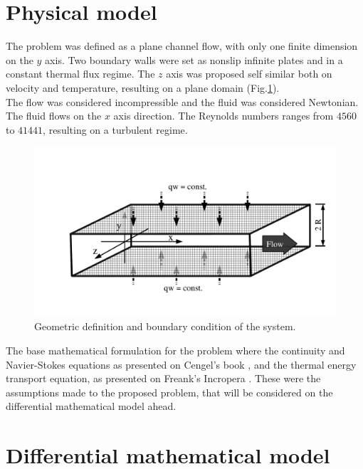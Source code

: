 \documentclass[10pt]{article} %
\begin{document}
\section{Physical model}

The problem was defined as a plane channel flow, with only one finite dimension on the $y$ axis. Two boundary walls were set as nonslip infinite plates and in a constant thermal flux regime. The $z$ axis was proposed self similar both on velocity and temperature, resulting on a plane domain (Fig.\ref{figure.1}). \\
The flow was considered incompressible and the fluid was considered Newtonian. The fluid flows on the $x$ axis direction. The Reynolds numbers ranges from $4560$ to $41441$, resulting on a turbulent regime. 

\begin{figure}[h!]
	\centering
	\includegraphics[angle=0, scale=0.50]{fotos_formatacao_final/canal1}
	\caption{Geometric definition and boundary condition of the system.}
	\label{figure.1}
\end{figure}

The base mathematical formulation for the problem where the continuity and Navier-Stokes equations as presented on Cengel's book \cite{Cengel}, and the thermal energy transport equation, as presented on Freank's Incropera \cite{Incropera}. These were the assumptions made to the proposed problem, that will be considered on the differential mathematical model ahead.









\section{Differential mathematical model}
\end{document}
